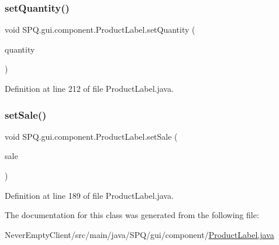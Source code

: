 \subsubsection{\texorpdfstring{set\+Quantity()}{setQuantity()}}
{\footnotesize\ttfamily void S\+P\+Q.\+gui.\+component.\+Product\+Label.\+set\+Quantity (\begin{DoxyParamCaption}\item[{J\+Label}]{quantity }\end{DoxyParamCaption})}



Definition at line 212 of file Product\+Label.\+java.

\mbox{\label{class_s_p_q_1_1gui_1_1component_1_1_product_label_a787ff03a48344b80ecb10a3717474cde}} 
\subsubsection{\texorpdfstring{set\+Sale()}{setSale()}}
{\footnotesize\ttfamily void S\+P\+Q.\+gui.\+component.\+Product\+Label.\+set\+Sale (\begin{DoxyParamCaption}\item[{J\+Label}]{sale }\end{DoxyParamCaption})}



Definition at line 189 of file Product\+Label.\+java.



The documentation for this class was generated from the following file\+:\begin{DoxyCompactItemize}
\item 
Never\+Empty\+Client/src/main/java/\+S\+P\+Q/gui/component/\mbox{\hyperlink{_product_label_8java}{Product\+Label.\+java}}\end{DoxyCompactItemize}
